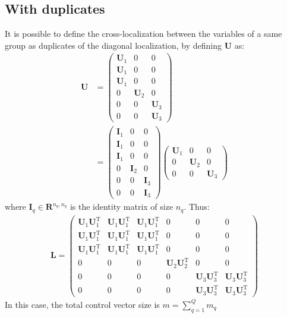 \documentclass[12pt]{scrartcl}
\begin{document}
\subsection{With duplicates}
It is possible to define the cross-localization between the variables of a same group as duplicates of the diagonal localization, by defining $\mathbf{U}$ as: 
\begin{align}
\mathbf{U} & = \left( \begin{array}{c|c|c}
\mathbf{U}_1 & 0 & 0 \\
\mathbf{U}_1 & 0 & 0 \\
\mathbf{U}_1 & 0 & 0 \\[0.3ex]
\hline
0 & \mathbf{U}_2 & 0 \\[0.3ex]
\hline
0 & 0 & \mathbf{U}_3 \\
0 & 0 & \mathbf{U}_3
\end{array} \right) \nonumber \\
& = \left( \begin{array}{c|c|c}
\mathbf{I}_1 & 0 & 0 \\
\mathbf{I}_1 & 0 & 0 \\
\mathbf{I}_1 & 0 & 0 \\[0.3ex]
\hline
0 & \mathbf{I}_2 & 0 \\[0.3ex]
\hline
0 & 0 & \mathbf{I}_3 \\
0 & 0 & \mathbf{I}_3
\end{array} \right)
\left( \begin{array}{c|c|c}
\mathbf{U}_1 & 0 & 0 \\[0.3ex]
\hline
0 & \mathbf{U}_2 & 0 \\[0.3ex]
\hline
0 & 0 & \mathbf{U}_3
\end{array} \right)
\end{align}
where $\mathbf{I}_q \in \mathbf{R}^{n_q,n_q}$ is the identity matrix of size $n_q$. Thus:
\begin{align}
\mathbf{L} = \left( \begin{array}{ccc|c|cc}
\mathbf{U}_1 \mathbf{U}_1^\mathrm{T} & \mathbf{U}_1 \mathbf{U}_1^\mathrm{T} & \mathbf{U}_1 \mathbf{U}_1^\mathrm{T} & 0 & 0 & 0 \\
\mathbf{U}_1 \mathbf{U}_1^\mathrm{T} & \mathbf{U}_1 \mathbf{U}_1^\mathrm{T} & \mathbf{U}_1 \mathbf{U}_1^\mathrm{T} & 0 & 0 & 0 \\
\mathbf{U}_1 \mathbf{U}_1^\mathrm{T} & \mathbf{U}_1 \mathbf{U}_1^\mathrm{T} & \mathbf{U}_1 \mathbf{U}_1^\mathrm{T} & 0 & 0 & 0 \\[0.3ex]
\hline
0 & 0 & 0 & \mathbf{U}_2 \mathbf{U}_2^\mathrm{T} & 0 & 0 \\[0.3ex]
\hline
0 & 0 & 0 & 0 & \mathbf{U}_3 \mathbf{U}_3^\mathrm{T} & \mathbf{U}_3 \mathbf{U}_3^\mathrm{T} \\
0 & 0 & 0 & 0 & \mathbf{U}_3 \mathbf{U}_3^\mathrm{T} & \mathbf{U}_3 \mathbf{U}_3^\mathrm{T}
\end{array} \right)
\end{align}
In this case, the total control vector size is $\displaystyle m = \sum_{q=1}^Q m_q$
\end{document}

